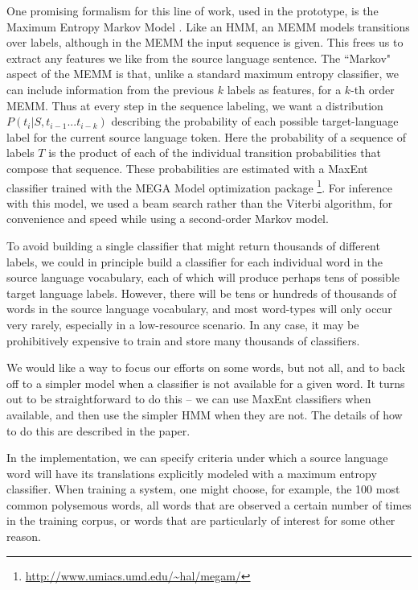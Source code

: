 One promising formalism for this line of work, used in the prototype, is the
Maximum Entropy Markov Model \cite{icml00/mccallum}.
Like an HMM, an MEMM models transitions over labels, although in the MEMM the
input sequence is given.
This frees us to extract any features we like from the source language
sentence. The ``Markov" aspect of the MEMM is that, unlike a standard maximum
entropy classifier, we can include information from the previous $k$ labels as
features, for a $k$-th order MEMM.
Thus at every step in the sequence labeling, we want a distribution
$P(t_i | S, t_{i-1}...t_{i-k})$ describing the probability of each possible
target-language label for the current source language token.
Here the probability of a sequence of labels $T$ is the product of each of the
individual transition probabilities that compose that sequence.
These probabilities are estimated with a MaxEnt classifier trained with 
the MEGA Model optimization package
\footnote{\url{http://www.umiacs.umd.edu/~hal/megam/}}.
For inference with this model, we used a beam search rather than the Viterbi
algorithm, for convenience and speed while using a second-order Markov model.

To avoid building a single classifier that might return
thousands of different labels, we could in principle build a classifier for
each individual word in the source language vocabulary, each of which will
produce perhaps tens of possible target language labels. However, there will be
tens or hundreds of thousands of words in the source language vocabulary, and
most word-types will only occur very rarely, especially in a low-resource
scenario.
In any case, it may be prohibitively expensive to train and store many
thousands of classifiers.

We would like a way to focus our efforts on some words, but not all, and to
back off to a simpler model when a classifier is not available for a given
word. It turns out to be straightforward to do this --  we can use MaxEnt
classifiers when available, and then use the simpler HMM when they are not. The
details of how to do this are described in the paper.

In the implementation, we can specify criteria under which a source language
word will have its translations explicitly modeled with a maximum entropy
classifier. When training a system, one might choose, for example, the 100 most
common polysemous words, all words that are observed a certain number of times
in the training corpus, or words that are particularly of interest for some
other reason.

